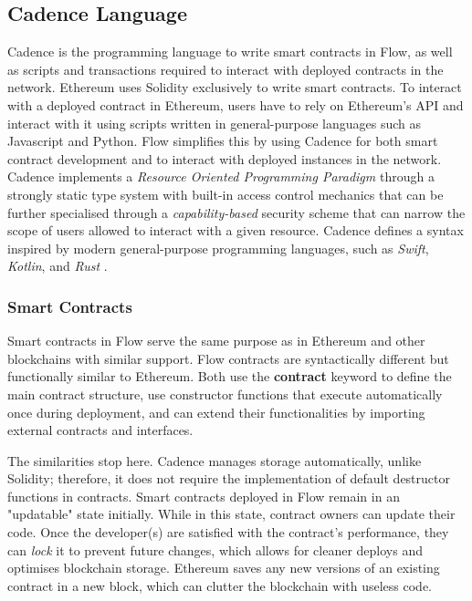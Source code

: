 \documentclass[../NFTComp_IEEE.tex]{subfiles}
\begin{document}
\subsection{Cadence Language}
\label{sec:cadence_language}
Cadence is the programming language to write smart contracts in Flow, as well as scripts and transactions required to interact with deployed contracts in the network. Ethereum uses Solidity exclusively to write smart contracts. To interact with a deployed contract in Ethereum, users have to rely on Ethereum's API and interact with it using scripts written in general-purpose languages such as Javascript and Python. Flow simplifies this by using Cadence for both smart contract development and to interact with deployed instances in the network. Cadence implements a \textit{Resource Oriented Programming Paradigm} through a strongly static type system with built-in access control mechanics that can be further specialised through a \textit{capability-based} security scheme that can narrow the scope of users allowed to interact with a given resource. Cadence defines a syntax inspired by modern general-purpose programming languages, such as \textit{Swift}, \textit{Kotlin}, and \textit{Rust} \cite{flow2020a} \cite{Cadence2023}.

\subsubsection{Smart Contracts}
\label{sec:smart_contracts}
Smart contracts in Flow serve the same purpose as in Ethereum and other blockchains with similar support. Flow contracts are syntactically different but functionally similar to Ethereum. Both use the \textbf{contract} keyword to define the main contract structure, use constructor functions that execute automatically once during deployment, and can extend their functionalities by importing external contracts and interfaces.
\par
The similarities stop here. Cadence manages storage automatically, unlike Solidity; therefore, it does not require the implementation of default destructor functions in contracts. Smart contracts deployed in Flow remain in an "updatable" state initially. While in this state, contract owners can update their code. Once the developer(s) are satisfied with the contract's performance, they can \textit{lock} it to prevent future changes, which allows for cleaner deploys and optimises blockchain storage. Ethereum saves any new versions of an existing contract in a new block, which can clutter the blockchain with useless code.
\end{document}
